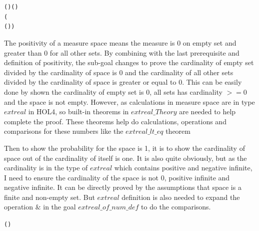 \documentclass{article}
\begin{document}
\begin{alltt}
  \HOLTokenTurnstile{}  ( ) \HOLSymConst{\HOLTokenConj{}}   \HOLSymConst{=}  ( ) \HOLSymConst{\HOLTokenImp{}}
   (  \HOLSymConst{\HOLTokenEquiv{}}
      \HOLSymConst{\HOLTokenConj{}}   ( ) \HOLSymConst{=}  \HOLSymConst{\HOLTokenConj{}}  )
\end{alltt}

The positivity of a measure space means the measure is 0 on empty set and greater than 0 for all other sets. By combining
with the last prerequisite and definition of positivity, the sub-goal changes to prove the cardinality of empty set divided
by the cardinality of space is 0 and the cardinality of all other sets divided by the cardinality of space is greater
or equal to 0. This can be easily done by shown the cardinality of empty set is 0, all sets has cardinality $>=0$ and
the space is not empty. However, as calculations in measure space are in type $extreal$ in HOL4, so built-in theorems
in $extreal\_Theory$ are needed to help complete the proof. These theorems help do calculations, operations and
comparisons for these numbers like the $extreal\_lt\_eq$ theorem

\begin{alltt}
  \HOLTokenTurnstile{}   \HOLSymConst{\HOLTokenLt{}}   \HOLSymConst{\HOLTokenEquiv{}}  \HOLSymConst{\HOLTokenLt{}} 
\end{alltt}

Then to show the probability for the space is 1, it is to show the cardinality of space out of the cardinality of itself
is one. It is also quite obviously, but as the cardinality is in the type of $extreal$ which contains positive and
negative infinite, I need to ensure the cardinality of the space is not 0, positive infinite and negative infinite. It
can be directly proved by the assumptions that space is a finite and non-empty set. But $extreal$ definition is also needed
to expand the operation $\&$ in the goal $extreal\_of\_num\_def$ to do the comparisons.

\begin{alltt}
  \HOLTokenTurnstile{} \HOLSymConst{\&} \HOLSymConst{=}  (\HOLSymConst{\&})
\end{alltt}
\end{document}
